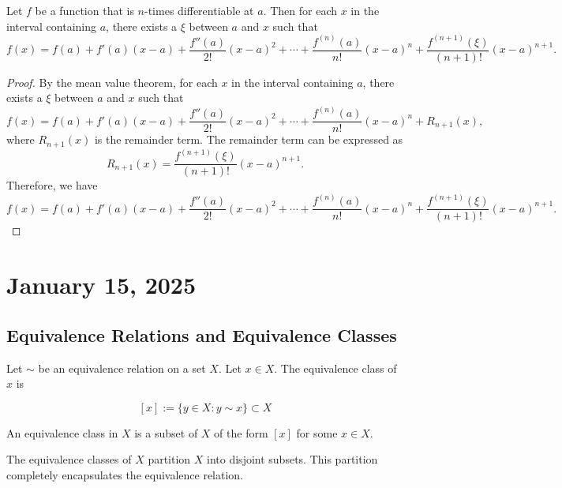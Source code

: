 \documentclass[11pt]{article}
\begin{document}
\begin{theorem}
    Let \( f \) be a function that is \( n \)-times differentiable at \( a \). Then for each \( x \) in the interval containing \( a \), there exists a \( \xi \) between \( a \) and \( x \) such that
    \[
        f(x) = f(a) + f'(a)(x - a) + \frac{f''(a)}{2!}(x - a)^2 + \cdots + \frac{f^{(n)}(a)}{n!}(x - a)^n + \frac{f^{(n+1)}(\xi)}{(n+1)!}(x - a)^{n+1}.
    \]
\end{theorem}

\begin{proof}
    By the mean value theorem, for each \( x \) in the interval containing \( a \), there exists a \( \xi \) between \( a \) and \( x \) such that
    \[
        f(x) = f(a) + f'(a)(x - a) + \frac{f''(a)}{2!}(x - a)^2 + \cdots + \frac{f^{(n)}(a)}{n!}(x - a)^n + R_{n+1}(x),
    \]
    where \( R_{n+1}(x) \) is the remainder term. The remainder term can be
    expressed as
    \[
        R_{n+1}(x) = \frac{f^{(n+1)}(\xi)}{(n+1)!}(x - a)^{n+1}.
    \]
    Therefore, we have
    \[
        f(x) = f(a) + f'(a)(x - a) + \frac{f''(a)}{2!}(x - a)^2 + \cdots + \frac{f^{(n)}(a)}{n!}(x - a)^n + \frac{f^{(n+1)}(\xi)}{(n+1)!}(x - a)^{n+1}.
    \]
\end{proof}

\section{January 15, 2025}

\subsection{Equivalence Relations and Equivalence Classes}

\begin{definition} Let $\sim$ be an equivalence relation on a set $X$. Let $x \in X$. The equivalence class of $x$ is

    \[
        [x] := \{ y \in X : y \sim x \} \subset X
    \]

    An equivalence class in $X$ is a subset of $X$ of the form $[x]$ for some $x
        \in X$.
\end{definition}

\begin{fact} The equivalence classes of $X$ partition $X$ into disjoint subsets. This partition completely encapsulates the equivalence relation.
\end{fact}
\end{document}
